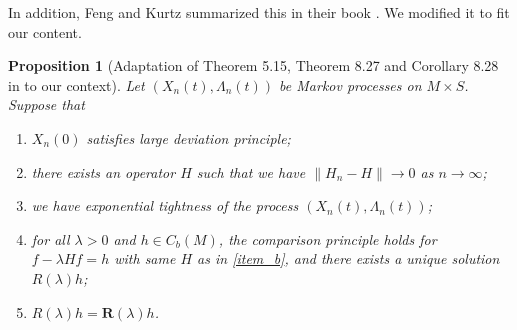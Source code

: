\documentclass[a4paper]{article}
\numberwithin{equation}{section}
\newtheorem{proposition}[theorem]{Proposition}
\theoremstyle{definition}
\begin{document}
In addition, Feng and Kurtz summarized this in their book \cite{FK2006}. We modified it to fit our content.
	\begin{proposition}[Adaptation of Theorem 5.15, Theorem 8.27 and Corollary 8.28 in \cite{FK2006} to our context]\label{proposition_bridge}
		Let $(X_n(t),\Lambda_n(t))$ be Markov processes on $M\times S$.
		Suppose that
		\begin{enumerate}
			\item  \label{item_a} $X_n(0)$  satisfies large deviation principle;
			\item \label{item_b} there exists an operator $H$ such that we have $\|H_n-H\|\to 0$ as $n\to\infty$;
			\item \label{item_c} we have exponential tightness of the process $(X_n(t),\Lambda_n(t))$;
			\item  \label{item_d} for all $\lambda>0$ and $h\in C_b(M)$, the comparison principle holds for $f-\lambda Hf=h$ with same $H$ as in \cref{item_b}, and there exists a unique solution $R(\lambda)h$;
  \item \label{item_e} $R(\lambda)h=\mathbf{R}(\lambda)h$.
		\end{enumerate}
	 

\end{proposition}
\end{document}
